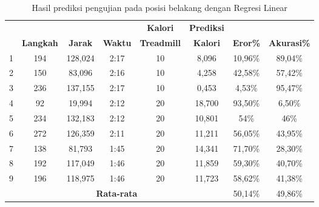 \begin{longtable}{|c|c|c|c|c|c|c|c|}
  \caption{Hasil prediksi pengujian pada posisi belakang dengan Regresi Linear}
  \label{tb:PengujianPosisiBelakangAnalisaPrediksiRegresi}                                   \\
  \hline
  \rowcolor[HTML]{C0C0C0}
  & & & & \textbf{Kalori} & \textbf{Prediksi} & & \\
  \rowcolor[HTML]{C0C0C0}
  \multirow{-2}{*}{\textbf{Percobaan}} & \multirow{-2}{*}{\textbf{Langkah}} & \multirow{-2}{*}{\textbf{Jarak}} & \multirow{-2}{*}{\textbf{Waktu}} & \textbf{Treadmill} & \textbf{Kalori} & \multirow{-2}{*}{\textbf{Eror\%}} & \multirow{-2}{*}{\textbf{Akurasi\%}} \\
  
  \hline
  1   & 194   & 128,024    & 2:17    & 10    & 8,096     & 10,96\%      & 89,04\%   \\
  \hline  
  2   & 150   & 83,096     & 2:16    & 10    & 4,258     & 42,58\%      & 57,42\%  \\
  \hline
  3   & 236   & 137,155    & 2:17    & 10    & 0,453     & 4,53\%       & 95,47\%   \\
  \hline
  4   & 92    & 19,994     & 2:12    & 20    & 18,700    & 93,50\%      & 6,50\%  \\
  \hline
  5   & 234   & 132,183    & 2:12    & 20    & 10,801    & 54\%         & 46\%    \\
  \hline
  6   & 272   & 126,359    & 2:11    & 20    & 11,211    & 56,05\%      & 43,95\%   \\
  \hline
  7   & 138   & 81,793     & 1:45    & 20    & 14,341    & 71,70\%      & 28,30\%   \\
  \hline
  8   & 192   & 117,049    & 1:46    & 20    & 11,859    & 59,30\%      & 40,70\%   \\
  \hline
  9   & 196   & 118,975    & 1:46    & 20    & 11,723    & 58,62\%      & 41,38\%   \\
  \hline

  \multicolumn{6}{|c|}{\textbf{Rata-rata}} & 50,14\% & 49,86\%  \\
  \hline
\end{longtable}

